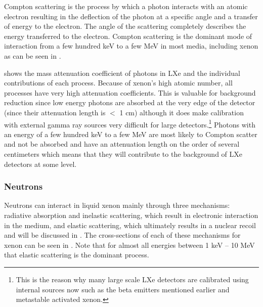 Compton scattering is the process by which a photon interacts with an atomic electron resulting in the deflection of the photon at a specific angle and a transfer of energy to the electron.  The angle of the scattering completely describes the energy transferred to the electron.  Compton scattering is the dominant mode of interaction from a few hundred keV to a few MeV in most media, including xenon as can be seen in .

 shows the mass attenuation coefficient of photons in LXe and the individual contributions of each process.  Because of xenon's high atomic number, all processes have very high attenuation coefficients.  This is valuable for background reduction since low energy photons are absorbed at the very edge of the detector (since their attenuation length is $<$ 1 cm) although it does make calibration with external gamma ray sources very difficult for large detectors.\footnote{This is the reason why many large scale LXe detectors are calibrated using internal sources now such as the beta emitters mentioned earlier and metastable activated xenon.}  Photons with an energy of a few hundred keV to a few MeV are most likely to Compton scatter and not be absorbed and have an attenuation length on the order of several centimeters which means that they will contribute to the background of LXe detectors at some level.
 

\subsubsection{Neutrons}

Neutrons can interact in liquid xenon mainly through three mechanisms: radiative absorption and inelastic scattering, which result in electronic interaction in the medium, and elastic scattering, which ultimately results in a nuclear recoil and will be discussed in .   The cross-sections of each of these mechanisms for xenon can be seen in .  Note that for almost all energies between 1 keV -- 10 MeV that elastic scattering is the dominant process.


